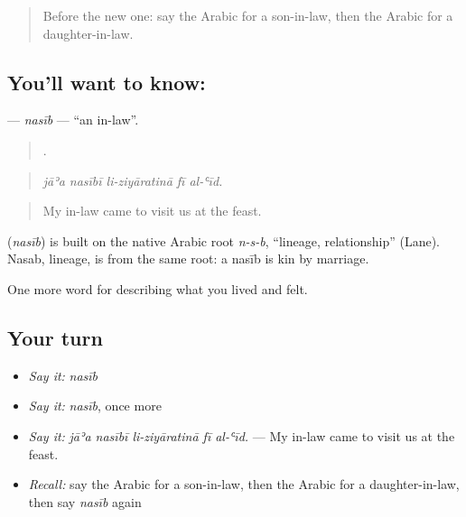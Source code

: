 \label{lesson:AR-C529-nasib}



\begin{quote}
Before the new one: say the Arabic for a son-in-law, then the Arabic for a daughter-in-law.
\end{quote}

\subsection*{You'll want to know: }
\textbf{} — \emph{nasīb} — \textquotedblleft{}an in-law\textquotedblright{}.

\begin{quote}
    .
\end{quote}

\begin{quote}
\emph{jāʾa nasībī li-ziyāratinā fī al-ʿīd.}
\end{quote}

\begin{quote}
My in-law came to visit us at the feast.
\end{quote}

\begin{cousinweb}
\textbf{} (\emph{nasīb}) is built on the native Arabic root \emph{n-s-b}, \textquotedblleft{}lineage, relationship\textquotedblright{} (Lane). Nasab, lineage, is from the same root: a nasīb is kin by marriage.
\end{cousinweb}

\begin{grammarlens}[title={What you've built}]
One more word for describing what you lived and felt.
\end{grammarlens}

\subsection*{Your turn}
\begin{itemize}
\raggedright
  \item \emph{Say it:} \emph{nasīb}
  \item \emph{Say it:} \emph{nasīb}, once more
  \item \emph{Say it:} \emph{jāʾa nasībī li-ziyāratinā fī al-ʿīd.} — My in-law came to visit us at the feast.
  \item \emph{Recall:} say the Arabic for a son-in-law, then the Arabic for a daughter-in-law, then say \emph{nasīb} again
\end{itemize}

